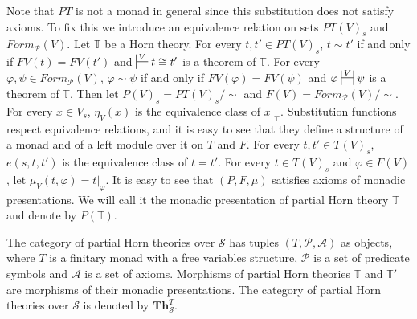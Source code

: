 \documentclass[reqno]{amsart}
\theoremstyle{definition}
\theoremstyle{remark}
\newcommand{\cat}[1]{\mathbf{#1}}
\newcommand{\Th}{\cat{Th}}
\numberwithin{figure}{section}
\begin{document}
Note that $PT$ is not a monad in general since this substitution does not satisfy axioms.
To fix this we introduce an equivalence relation on sets $PT(V)_s$ and $Form_\mathcal{P}(V)$.
Let $\mathbb{T}$ be a Horn theory.
For every $t, t' \in PT(V)_s$, $t \sim t'$ if and only if $FV(t) = FV(t')$ and $\sststile{}{V} t \cong t'$ is a theorem of $\mathbb{T}$.
For every $\varphi, \psi \in Form_\mathcal{P}(V)$, $\varphi \sim \psi$ if and only if $FV(\varphi) = FV(\psi)$ and $\varphi \ssststile{}{V} \psi$ is a theorem of $\mathbb{T}$.
Then let $P(V)_s = PT(V)_s/\sim$ and $F(V) = Form_\mathcal{P}(V)/\sim$.
For every $x \in V_s$, $\eta_V(x)$ is the equivalence class of $x|_\top$.
Substitution functions respect equivalence relations, and it is easy to see that they define a structure of a monad and of a left module over it on $T$ and $F$.
For every $t,t' \in T(V)_s$, $e(s,t,t')$ is the equivalence class of $t = t'$.
For every $t \in T(V)_s$ and $\varphi \in F(V)$, let $\mu_V(t,\varphi) = t|_\varphi$.
It is easy to see that $(P,F,\mu)$ satisfies axioms of monadic presentations.
We will call it the monadic presentation of partial Horn theory $\mathbb{T}$ and denote by $P(\mathbb{T})$.

The category of partial Horn theories over $\mathcal{S}$ has tuples $(T,\mathcal{P},\mathcal{A})$ as objects,
    where $T$ is a finitary monad with a free variables structure, $\mathcal{P}$ is a set of predicate symbols and $\mathcal{A}$ is a set of axioms.
Morphisms of partial Horn theories $\mathbb{T}$ and $\mathbb{T}'$ are morphisms of their monadic presentations.
The category of partial Horn theories over $\mathcal{S}$ is denoted by $\Th^T_\mathcal{S}$.
\end{document}
